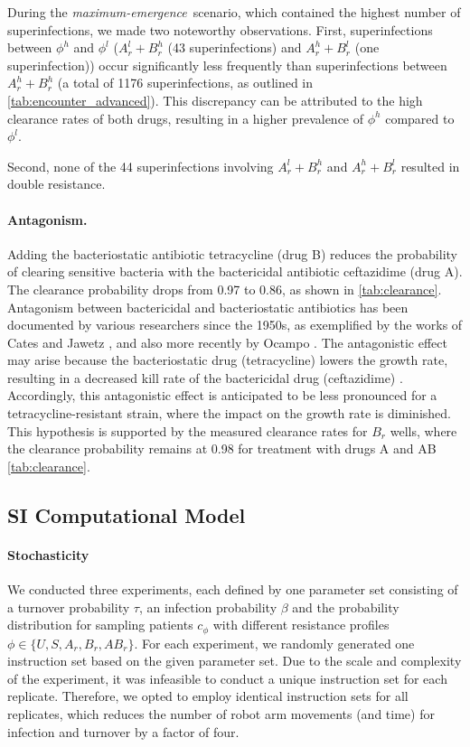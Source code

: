 During the \textit{maximum-emergence}~scenario, which contained the highest number of superinfections, we made two noteworthy observations. 
First, superinfections between $\phi^h$ and $\phi^l$ ($A_r^l + B_r^h$  (43 superinfections) and $A_r^h + B_r^l$ (one superinfection)) occur significantly less frequently than superinfections between $A_r^h + B_r^h$ (a total of 1176 superinfections, as outlined in \autoref{tab:encounter_advanced}). This discrepancy can be attributed to the high clearance rates of both drugs, resulting in a higher prevalence of $\phi^h$ compared to $\phi^l$.

Second, none of the 44 superinfections involving $A_r^l + B_r^h$ and $A_r^h + B_r^l$ resulted in double resistance.


\paragraph{Antagonism.\label{ssec:antagonism}}
Adding the bacteriostatic antibiotic tetracycline (drug B) reduces the probability of clearing sensitive bacteria with the bactericidal antibiotic ceftazidime (drug A). The clearance probability drops from 0.97 to 0.86, as shown in \autoref{tab:clearance}. 
Antagonism between bactericidal and bacteriostatic antibiotics has been documented by various researchers since the 1950s, as exemplified by the works of Cates \cite{Cates1951} and Jawetz \cite{Jawetz1957}, and also more recently by Ocampo \cite{Ocampo2014}.
The antagonistic effect may arise because the bacteriostatic drug (tetracycline) lowers the growth rate, resulting in a decreased kill rate of the bactericidal drug (ceftazidime) \cite{Angermayr2022}. 
Accordingly, this antagonistic effect is anticipated to be less pronounced for a tetracycline-resistant strain, where the impact on the growth rate is diminished. This hypothesis is supported by the measured clearance rates for $B_r$ wells, where the clearance probability remains at 0.98 for treatment with drugs A and AB \autoref{tab:clearance}.


\subsection{SI Computational Model\label{ssec: model}}
\paragraph{Stochasticity}
We conducted three experiments, each defined by one parameter set consisting of a turnover probability $\tau$, an infection probability $\beta$ and the probability distribution for sampling patients $c_\phi$ with different resistance profiles $\phi \in \{U, S, A_r, B_r, AB_r\}$.
For each experiment, we randomly generated one instruction set based on the given parameter set.
Due to the scale and complexity of the experiment, it was infeasible to conduct a unique instruction set for each replicate. 
Therefore, we opted to employ identical instruction sets for all replicates, which reduces the number of robot arm movements (and time) for infection and turnover by a factor of four.

